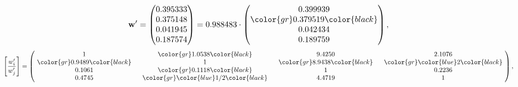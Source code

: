 \begin{example}
\begin{equation*}
\mathbf{w}^{\prime} =
\begin{pmatrix}
0.395333\\
0.375148\\
0.041945\\
0.187574
\end{pmatrix} =
0.988483\cdot
\begin{pmatrix}
0.399939\\
\color{gr} 0.379519\color{black} \\
0.042434\\
0.189759
\end{pmatrix},
\end{equation*}
\begin{equation*}
\left[ \frac{{w}^{\prime}_i}{{w}^{\prime}_j} \right] =
\begin{pmatrix}
$\,\,$ 1 $\,\,$ & $\,\,$\color{gr} 1.0538\color{black} $\,\,$ & $\,\,$9.4250$\,\,$ & $\,\,$2.1076$\,\,$ \\
$\,\,$\color{gr} 0.9489\color{black} $\,\,$ & $\,\,$ 1 $\,\,$ & $\,\,$\color{gr} 8.9438\color{black} $\,\,$ & $\,\,$\color{gr} \color{blue} 2\color{black}   $\,\,$ \\
$\,\,$0.1061$\,\,$ & $\,\,$\color{gr} 0.1118\color{black} $\,\,$ & $\,\,$ 1 $\,\,$ & $\,\,$0.2236 $\,\,$ \\
$\,\,$0.4745$\,\,$ & $\,\,$\color{gr} \color{blue}  1/2\color{black} $\,\,$ & $\,\,$4.4719$\,\,$ & $\,\,$ 1  $\,\,$ \\
\end{pmatrix},
\end{equation*}
\end{example}
\newpage
